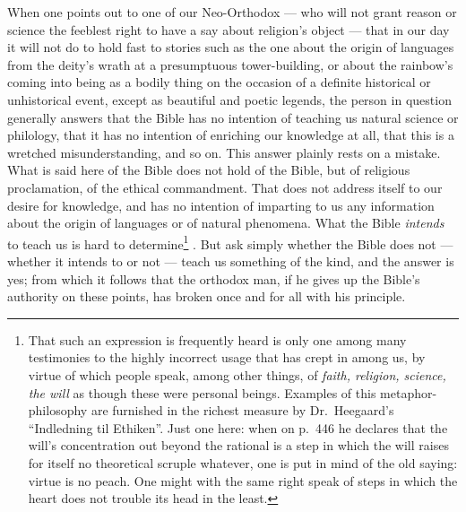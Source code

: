 \documentclass[12pt,a4paper]{book}
\renewcommand{\thefootnote}{*)}
\newcommand{\fnmark}[2]{\renewcommand{\thefootnote}{#1}\footnote{#2}%
  \renewcommand{\thefootnote}{*)}}
\newcommand{\opage}[1]{\marginnote{\footnotesize\textit{[#1]}}}
\begin{document}
When one points out to one of our Neo-Orthodox --- who will not grant reason or
science the feeblest right to have a say about religion's object --- that in our
day it will not do to hold fast to stories such as the one about the origin of
languages from the deity's wrath at a presumptuous tower-building, or about the
rainbow's coming into being as a bodily thing on the occasion of a definite
historical
\opage{21}or unhistorical event, except as beautiful and poetic legends, the
person in question generally answers that the Bible has no intention of
teaching us natural science or philology, that it has no intention of enriching
our knowledge at all, that this is a wretched misunderstanding, and so on. This
answer plainly rests on a mistake. What is said here of the Bible does not hold
of the Bible, but of religious proclamation, of the ethical commandment. That
does not address itself to our desire for knowledge, and has no intention of
imparting to us any information about the origin of languages or of natural
phenomena. What the Bible \emph{intends} to teach us is hard to
determine\fnmark{*)}{That such an expression is frequently heard is only one
among many testimonies to the highly incorrect usage that has crept in among
us, by virtue of which people speak, among other things, of \emph{faith,
religion, science, the will} as though these were personal beings. Examples of
this metaphor-philosophy are furnished in the richest measure by Dr.\
Heegaard's ``Indledning til Ethiken''. Just one here: when on p.\ 446 he
declares that the will's concentration out beyond the rational is a step in
which the will raises for itself no theoretical scruple whatever, one is put in
mind of the old saying: virtue is no peach. One might with the same right speak
of steps in which the heart does not trouble its head in the least.}. But ask
simply whether the Bible does not --- whether it intends to or not --- teach us
something of the kind, and the answer is yes; from which it follows that the
orthodox man, if he gives up the Bible's authority on these points, has broken
once and for all with his principle.
\end{document}
